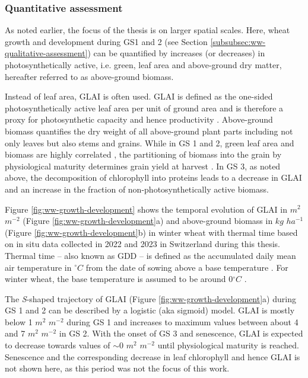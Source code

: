\subsubsection{Quantitative assessment}
As noted earlier, the focus of the thesis is on larger spatial scales. Here, wheat growth and development during \gls{GS}1 and 2 (see Section \ref{subsubsec:ww-qualitative-assessment}) can be quantified by increases (or decreases) in photosynthetically active, i.e. green, leaf area and above-ground dry matter, hereafter referred to as above-ground biomass.

Instead of leaf area, \gls{GLAI} is often used. \gls{GLAI} is defined as the one-sided photosynthetically active leaf area per unit of ground area \citep{watson_dependence_1958,maddonni_leaf_1996} and is therefore a proxy for photosynthetic capacity and hence productivity \citep{gitelson_productivity_2015}. Above-ground biomass quantifies the dry weight of all above-ground plant parts including not only leaves but also stems and grains. While in \gls{GS} 1 and 2, green leaf area and biomass are highly correlated \citep{aase_relationship_1978}, the partitioning of biomass into the grain by physiological maturity determines grain yield at harvest \citep{singh_harvest_1971}. In \gls{GS} 3, as noted above, the decomposition of chlorophyll into proteins leads to a decrease in \gls{GLAI} and an increase in the fraction of non-photosynthetically active biomass.

Figure \ref{fig:ww-growth-development} shows the temporal evolution of \gls{GLAI} in $m^2$ $m^{-2}$ (Figure \ref{fig:ww-growth-development}a) and above-ground biomass in $kg$ $ha^{-1}$ (Figure \ref{fig:ww-growth-development}b) in winter wheat with thermal time based on in situ data collected in 2022 and 2023 in Switzerland during this thesis. Thermal time -- also known as \gls{GDD} -- is defined as the accumulated daily mean air temperature in $^{\circ} C$ from the date of sowing above a base temperature \citep{mcmaster_growing_1997}. For winter wheat, the base temperature is assumed to be around 0$^{\circ} C$ \citep{porter_temperatures_1999}.

The \textsl{S}-shaped trajectory of \gls{GLAI} (Figure \ref{fig:ww-growth-development}a) during \gls{GS} 1 and 2 can be described by a logistic (aka sigmoid) model. \gls{GLAI} is mostly below 1 $m^2$ $m^{-2}$ during \gls{GS} 1 and increases to maximum values between about 4 and 7 $m^2$ $m^{-2}$ in \gls{GS} 2. With the onset of \gls{GS} 3 and senescence, \gls{GLAI} is expected to decrease towards values of $\sim 0$ $m^2$ $m^{-2}$ until physiological maturity is reached. Senescence and the corresponding decrease in leaf chlorophyll and hence \gls{GLAI} is not shown here, as this period was not the focus of this work.

